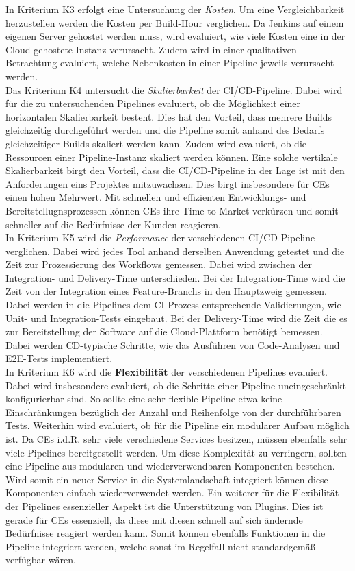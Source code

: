 In Kriterium K3 erfolgt eine Untersuchung der \textit{Kosten}. Um eine Vergleichbarkeit herzustellen werden die Kosten per Build-Hour verglichen. Da Jenkins auf einem eigenen Server gehostet werden muss, wird evaluiert, wie viele Kosten eine in der Cloud gehostete Instanz verursacht. Zudem wird in einer qualitativen Betrachtung evaluiert, welche Nebenkosten in einer Pipeline jeweils verursacht werden.\\
Das Kriterium K4 untersucht die \textit{Skalierbarkeit} der CI/CD-Pipeline. Dabei wird für die zu untersuchenden Pipelines evaluiert, ob die Möglichkeit einer horizontalen Skalierbarkeit besteht. Dies hat den Vorteil, dass mehrere Builds gleichzeitig durchgeführt werden und die Pipeline somit anhand des Bedarfs gleichzeitiger Builds skaliert werden kann. Zudem wird evaluiert, ob die Ressourcen einer Pipeline-Instanz skaliert werden können. Eine solche vertikale Skalierbarkeit birgt den Vorteil, dass die CI/CD-Pipeline in der Lage ist mit den Anforderungen eins Projektes mitzuwachsen. Dies birgt insbesondere für CEs einen hohen Mehrwert. Mit schnellen und effizienten Entwicklungs- und Bereitstellugnsprozessen können CEs ihre Time-to-Market verkürzen und somit schneller auf die Bedürfnisse der Kunden reagieren.\\
In Kriterium K5 wird die \textit{Performance} der verschiedenen CI/CD-Pipeline verglichen. Dabei wird jedes Tool anhand derselben Anwendung getestet und die Zeit zur Prozessierung des Workflows gemessen. Dabei wird zwischen der Integration- und Delivery-Time unterschieden. Bei der Integration-Time wird die Zeit von der Integration eines Feature-Branchs in den Hauptzweig gemessen. Dabei werden in die Pipelines dem CI-Prozess entsprechende Validierungen, wie Unit- und Integration-Tests eingebaut. Bei der Delivery-Time wird die Zeit die es zur Bereitstellung der Software auf die Cloud-Plattform benötigt bemessen. Dabei werden CD-typische Schritte, wie das Ausführen von Code-Analysen und E2E-Tests implementiert.\\
In Kriterium K6 wird die \textbf{Flexibilität} der verschiedenen Pipelines evaluiert. Dabei wird insbesondere evaluiert, ob die Schritte einer Pipeline uneingeschränkt konfigurierbar sind. So sollte eine sehr flexible Pipeline etwa keine Einschränkungen bezüglich der Anzahl und Reihenfolge von der durchführbaren Tests. Weiterhin wird evaluiert, ob für die Pipeline ein modularer Aufbau möglich ist. Da CEs i.d.R. sehr viele verschiedene Services besitzen, müssen ebenfalls sehr viele Pipelines bereitgestellt werden. Um diese Komplexität zu verringern, sollten eine Pipeline aus modularen und wiederverwendbaren Komponenten bestehen. Wird somit ein neuer Service in die Systemlandschaft integriert können diese Komponenten einfach wiederverwendet werden. Ein weiterer für die Flexibilität der Pipelines essenzieller Aspekt ist die Unterstützung von Plugins. Dies ist gerade für CEs essenziell, da diese mit diesen schnell auf sich ändernde Bedürfnisse reagiert werden kann. Somit können ebenfalls Funktionen in die Pipeline integriert werden, welche sonst im Regelfall nicht standardgemäß verfügbar wären. 
